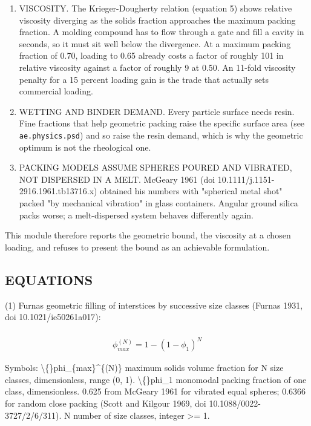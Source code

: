 \documentclass[10pt,a4paper,twoside]{report}
\begin{document}
\begin{enumerate}[leftmargin=*,label=\arabic*.]
\item VISCOSITY. The Krieger-Dougherty relation (equation 5) shows relative viscosity diverging as the solids fraction approaches the maximum packing fraction. A molding compound has to flow through a gate and fill a cavity in seconds, so it must sit well below the divergence. At a maximum packing fraction of 0.70, loading to 0.65 already costs a factor of roughly 101 in relative viscosity against a factor of roughly 9 at 0.50. An 11-fold viscosity penalty for a 15 percent loading gain is the trade that actually sets commercial loading.
\item WETTING AND BINDER DEMAND. Every particle surface needs resin. Fine fractions that help geometric packing raise the specific surface area (see \texttt{ae.physics.psd}) and so raise the resin demand, which is why the geometric optimum is not the rheological one.
\item PACKING MODELS ASSUME SPHERES POURED AND VIBRATED, NOT DISPERSED IN A MELT. McGeary 1961 (doi 10.1111/j.1151-2916.1961.tb13716.x) obtained his numbers with "spherical metal shot" packed "by mechanical vibration" in glass containers. Angular ground silica packs worse; a melt-dispersed system behaves differently again.
\end{enumerate}

This module therefore reports the geometric bound, the viscosity at a chosen loading, and refuses to present the bound as an achievable formulation.

\subsection*{EQUATIONS}

(1) Furnas geometric filling of interstices by successive size classes (Furnas 1931, doi 10.1021/ie50261a017):

\begin{equation*}
\begin{gathered}
\\ \phi_{max}^{(N)} = 1 - (1 - \phi_1)^{N}
\end{gathered}
\end{equation*}

Symbols: \textbackslash\{\}phi\_\{max\}\textasciicircum{}\{(N)\}   maximum solids volume fraction for N size classes, dimensionless, range (0, 1). \textbackslash\{\}phi\_1             monomodal packing fraction of one class, dimensionless. 0.625 from McGeary 1961 for vibrated equal spheres; 0.6366 for random close packing (Scott and Kilgour 1969, doi 10.1088/0022-3727/2/6/311). N                  number of size classes, integer >= 1.
\end{document}

